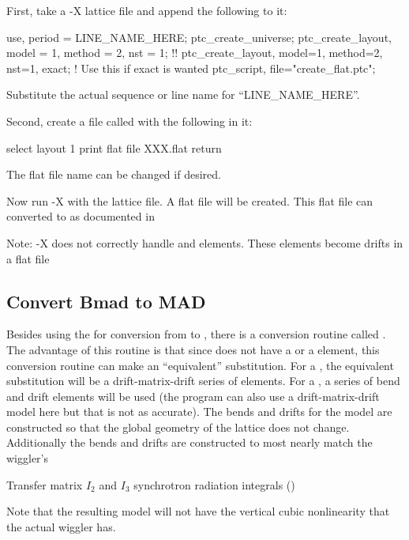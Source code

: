 First, take a \mad-X lattice file and append the following to it:
\begin{example}
  use, period = LINE_NAME_HERE;
  ptc_create_universe;
  ptc_create_layout, model = 1, method = 2, nst = 1; 
  !! ptc_create_layout, model=1, method=2, nst=1, exact;  ! Use this if exact is wanted
  ptc_script, file="create_flat.ptc";
\end{example}
Substitute the actual sequence or line name for ``LINE_NAME_HERE''.

Second, create a file called  with the following in it:
\begin{example}
  select layout
  1
  print flat file
  XXX.flat
  return
\end{example}
The flat file name  can be changed if desired.

Now run \mad-X with the lattice file. A flat file will be created. This flat file can
converted to \bmad as documented in 

Note: \mad-X does not correctly handle  and  elements. These
elements become drifts in a flat file

\subsection{Convert Bmad to MAD}
\label{s:mad.bmad.uap}

Besides using the  for conversion
from \bmad to \mad, there is a \bmad conversion routine called
. 
The advantage of this routine is that since \mad does not have a
 or a  element, this conversion routine can
make an ``equivalent'' substitution. For a , the
equivalent substitution will be a drift-matrix-drift series of
elements. For a , a series of bend and drift elements will
be used (the program can also use a drift-matrix-drift model here but
that is not as accurate). The bends and drifts for the 
model are constructed so that the global geometry of the lattice does
not change. Additionally the bends and drifts are constructed to most
nearly match the wiggler's
\begin{example}
  Transfer matrix
  $I_2$ and $I_3$ synchrotron radiation integrals ()
\end{example}
Note that the resulting model will not have the vertical cubic
nonlinearity that the actual wiggler has.

